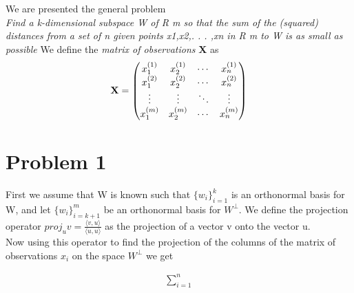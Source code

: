 \documentclass[a4paper,norsk]{article}
\begin{document}
\maketitle

We are presented the general problem \\
\textit{Find a k-dimensional subspace W of R m so that the sum of the (squared) distances from a set of n given points x1,x2,. . . ,xn in R m to W is as small as possible}
We define the \textit{matrix of observations} \textbf{X} as \\

\begin{align*}
	\text{\textbf{X}} = 
 \begin{pmatrix}
  x_{1}^{(1)} & x_{2}^{(1)} & \cdots & x_{n}^{(1)} \\
  x_{1}^{(2)} & x_{2}^{(2)} & \cdots & x_{n}^{(2)} \\
  \vdots  & \vdots  & \ddots & \vdots  \\
  x_{1}^{(m)} & x_{2}^{(m)} & \cdots & x_{n}^{(m)}
 \end{pmatrix}
\end{align*}

\section{Problem 1}
First we assume that W is known such that $\{w_i\}_{i=1}^{k}$ is an orthonormal basis for W, and let $\{w_i\}_{i=k+1}^{m}$
be an orthonormal basis for $W^{\perp}$. We define the projection operator 
$proj_u v = \frac{\langle v , u\rangle}{\langle u, u \rangle}$ as the projection of a vector v onto the vector u. \\
Now using this operator to find the projection of the columns of the matrix of observations $x_i$ on the space $W^\perp$ we get 

\begin{align*}
\sum_{i=1}^n	
\end{align*}
\end{document}
